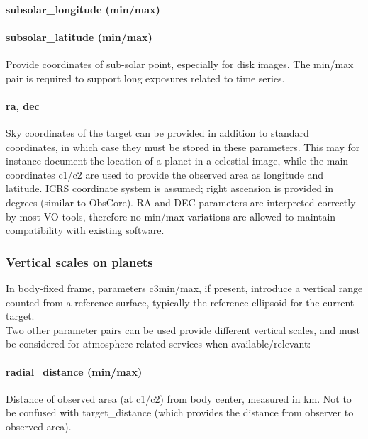 \documentclass[11pt,a4paper]{ivoa}
\begin{document}
\paragraph{subsolar\_longitude (min/max)}

\paragraph{subsolar\_latitude (min/max)}

Provide coordinates of sub-solar point, especially for disk images. The min/max pair is required to support long exposures related to time series.

\paragraph{ra, dec}

Sky coordinates of the target can be provided in addition to standard coordinates, in which case they must be stored in these parameters. This may for instance document the location of a planet in a celestial image, while the main coordinates c1/c2 are used to provide the observed area as longitude and latitude. ICRS coordinate system is assumed; right ascension is provided in degrees (similar to ObsCore). RA and DEC parameters are interpreted correctly by most VO tools, therefore no min/max variations are allowed to maintain compatibility with existing software. 

\subsubsection{Vertical scales on planets}

In body-fixed frame, parameters c3min/max, if present, introduce a vertical range counted from a reference surface, typically the reference ellipsoid for the current target. \\

Two other parameter pairs can be used provide different vertical scales, and must be considered for atmosphere-related services when available/relevant: \\

\paragraph{radial\_distance (min/max)}

Distance of observed area (at c1/c2) from body center, measured in km. Not to be confused with target\_distance (which provides the distance from observer to observed area). 
\end{document}
